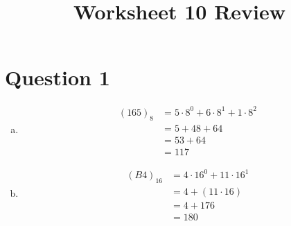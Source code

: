 \documentclass[12pt]{article}
\begin{document}
\title{Worksheet 10 Review}
\maketitle

\section*{Question 1}
\begin{enumerate}[a.]
    \item
    \begin{align}
        (165)_8 &= 5 \cdot 8^0 + 6 \cdot 8^1 + 1 \cdot 8^2\\
        &= 5 + 48 + 64\\
        &= 53 + 64\\
        &= 117
    \end{align}

    \item
    \setcounter{equation}{0}
    \begin{align}
        (B4)_16 &= 4 \cdot 16^0 + 11 \cdot 16^1\\
        &= 4 + (11 \cdot 16)\\
        &= 4 + 176\\
        &= 180
    \end{align}
\end{enumerate}
\end{document}
